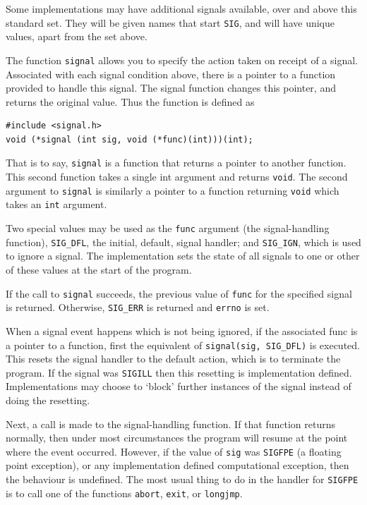   Some implementations may have additional signals available, over and above
   this standard set. They will be given names that start \texttt{SIG}, and
   will have unique values, apart from the set above.


  The function \texttt{signal} allows you to specify the action taken on
   receipt of a signal.  Associated with each signal condition above, there is
   a pointer to a function provided to handle this signal. The signal function
   changes this pointer, and returns the original value.  Thus the function is
   defined as


  \begin{Verbatim}
#include <signal.h>
void (*signal (int sig, void (*func)(int)))(int);
\end{Verbatim}

  That is to say, \texttt{signal} is a function that returns a  pointer
   to another function. This second function takes a single int argument and
   returns \texttt{void}.  The second argument to \texttt{signal} is
   similarly a pointer to a function returning \texttt{void} which takes an
   \texttt{int} argument.


  Two special values may be used as  the  \texttt{func}  argument  (the
   signal-handling  function),  \texttt{SIG\_DFL},  the initial, default,
   signal handler; and \texttt{SIG\_IGN},  which  is  used  to  ignore
   a signal.  The implementation sets the state of all signals to one or other
   of these values at the start of the program.


  If the call to \texttt{signal} succeeds, the previous value  of
   \texttt{func} for the specified signal is returned.  Otherwise,
   \texttt{SIG\_ERR} is returned and \texttt{errno} is set.


  When a signal event happens which is not being  ignored,  if the
   associated  func  is a pointer to a function, first the equivalent of
   \texttt{signal(sig, SIG\_DFL)} is executed. This  resets the  signal
   handler  to  the  default  action,  which is to terminate the program.  If
   the signal was \texttt{SIGILL}  then  this resetting  is  implementation
   defined.  Implementations may choose to `block' further instances of
   the signal instead of doing the resetting.


  Next, a call is made to the  signal-handling  function.   If that
   function   returns   normally,   then   under   most circumstances the
   program will resume at the point where the event  occurred.  However, if the
   value of \texttt{sig} was \texttt{SIGFPE} (a floating point
   exception),  or  any  implementation  defined computational  exception,
   then  the behaviour is undefined.  The most usual thing to do in the handler
   for \texttt{SIGFPE}  is  to call one of the functions
   \texttt{abort}, \texttt{exit}, or \texttt{longjmp}.


